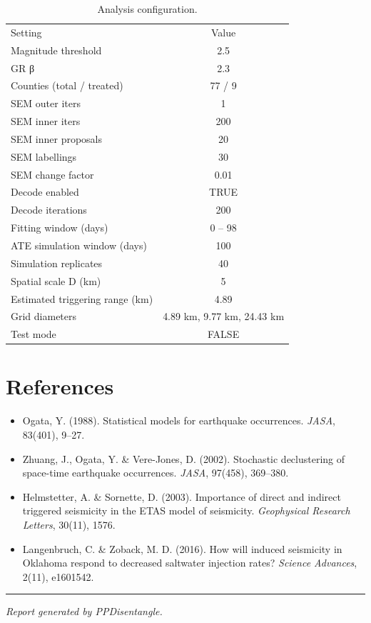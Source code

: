 \documentclass[
]{article}
\providecommand{\tightlist}{%
  \setlength{\itemsep}{0pt}\setlength{\parskip}{0pt}}
\begin{document}
\begin{longtable}[t]{lc}

\caption{\label{tbl-config}Analysis configuration.}

\tabularnewline

\\
\toprule
Setting & Value\\
\midrule
Magnitude threshold & 2.5\\
GR β & 2.3\\
Counties (total / treated) & 77 / 9\\
SEM outer iters & 1\\
SEM inner iters & 200\\
\addlinespace
SEM inner proposals & 20\\
SEM labellings & 30\\
SEM change factor & 0.01\\
Decode enabled & TRUE\\
Decode iterations & 200\\
\addlinespace
Fitting window (days) & 0 – 98\\
ATE simulation window (days) & 100\\
Simulation replicates & 40\\
Spatial scale D (km) & 5\\
Estimated triggering range (km) & 4.89\\
\addlinespace
Grid diameters & 4.89 km, 9.77 km, 24.43 km\\
Test mode & FALSE\\
\bottomrule

\end{longtable}

\section{References}\label{references}

\begin{itemize}
\tightlist
\item
  Ogata, Y. (1988). Statistical models for earthquake occurrences.
  \emph{JASA}, 83(401), 9--27.
\item
  Zhuang, J., Ogata, Y. \& Vere-Jones, D. (2002). Stochastic
  declustering of space-time earthquake occurrences. \emph{JASA},
  97(458), 369--380.
\item
  Helmstetter, A. \& Sornette, D. (2003). Importance of direct and
  indirect triggered seismicity in the ETAS model of seismicity.
  \emph{Geophysical Research Letters}, 30(11), 1576.
\item
  Langenbruch, C. \& Zoback, M. D. (2016). How will induced seismicity
  in Oklahoma respond to decreased saltwater injection rates?
  \emph{Science Advances}, 2(11), e1601542.
\end{itemize}

\begin{center}\rule{0.5\linewidth}{0.5pt}\end{center}

\emph{Report generated by PPDisentangle.}
\end{document}
